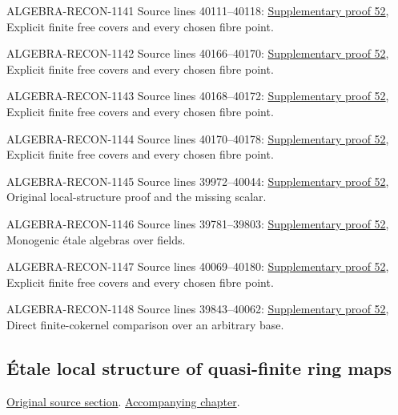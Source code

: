 \begin{AlgebraSourceRoutes}
\item[ALGEBRA-RECON-1141] Source lines 40111--40118: \hyperlink{algebra_etale_local_notes_20260928}{Supplementary proof 52}, Explicit finite free covers and every chosen fibre point.
\item[ALGEBRA-RECON-1142] Source lines 40166--40170: \hyperlink{algebra_etale_local_notes_20260928}{Supplementary proof 52}, Explicit finite free covers and every chosen fibre point.
\item[ALGEBRA-RECON-1143] Source lines 40168--40172: \hyperlink{algebra_etale_local_notes_20260928}{Supplementary proof 52}, Explicit finite free covers and every chosen fibre point.
\item[ALGEBRA-RECON-1144] Source lines 40170--40178: \hyperlink{algebra_etale_local_notes_20260928}{Supplementary proof 52}, Explicit finite free covers and every chosen fibre point.
\item[ALGEBRA-RECON-1145] Source lines 39972--40044: \hyperlink{algebra_etale_local_notes_20260928}{Supplementary proof 52}, Original local-structure proof and the missing scalar.
\item[ALGEBRA-RECON-1146] Source lines 39781--39803: \hyperlink{algebra_etale_local_notes_20260928}{Supplementary proof 52}, Monogenic étale algebras over fields.
\item[ALGEBRA-RECON-1147] Source lines 40069--40180: \hyperlink{algebra_etale_local_notes_20260928}{Supplementary proof 52}, Explicit finite free covers and every chosen fibre point.
\item[ALGEBRA-RECON-1148] Source lines 39843--40062: \hyperlink{algebra_etale_local_notes_20260928}{Supplementary proof 52}, Direct finite-cokernel comparison over an arbitrary base.
\end{AlgebraSourceRoutes}

\subsection{\'Etale local structure of quasi-finite ring maps}
\hypertarget{algebra-source-section-etale-local-quasi-finite}{}
\noindent\href{https://github.com/stacks/stacks-project/blob/a04446e57ec1fbc252a871afcec7752fb2807b14/algebra.tex\#L40188}{Original source section}. \href{algebra.pdf\#nameddest=section-etale-local-quasi-finite}{Accompanying chapter}.

